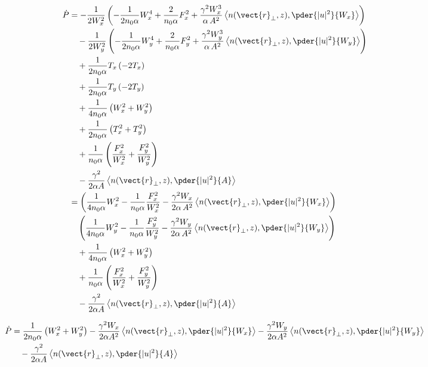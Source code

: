 \begin{equation}
\begin{split}
    \dot{P}  &= -\frac{1}{2W_{x}^2} \left(- \frac{1}{2 n_0 \alpha} W_{x}^4+ \frac{2}{n_0 \alpha} F_{x}^2  + \frac{\gamma^2 W_{x}^3}{ \alpha\, A^2}  \left<n(\vect{r}_{\perp},z), \pder{|u|^2}{W_{x}}\right>\right)  \\
    &\quad - \frac{1}{2W_{y}^2} \left(- \frac{1}{2 n_0 \alpha} W_{y}^4 + \frac{2}{n_0 \alpha} F_{y}^2  + \frac{\gamma^2 W_{y}^3}{ \alpha\, A^2}  \left<n(\vect{r}_{\perp},z), \pder{|u|^2}{W_{y}}\right>\right)\\
    &\quad + \frac{1}{2 n_0 \alpha}T_x  \left( - 2T_x \right) \\
    &\quad + \frac{1}{2 n_0 \alpha}T_y  \left( - 2T_y \right) \\
    &\quad + \frac{1}{4 n_0 \alpha}  \left(W_x^2+ W_y^2\right) \\    
    &\quad + \frac{1}{2 n_0 \alpha}  \left(T_x^2 + T_y^2 \right) \\
    &\quad + \frac{1}{n_0 \alpha}  \left(\frac{F_{x}^2}{W_{x}^2} + \frac{F_{y}^2}{W_{y}^2}\right) \\
    &\quad -  \frac{\gamma^2}{2 \alpha A} \left< n(\vect{r}_{\perp},z),\pder{|u|^2}{A}\right>   \\
    &=  \left(\frac{1}{4 n_0 \alpha} W_{x}^2 -\frac{1}{n_0 \alpha} \frac{F_{x}^2}{W_{x}^2} - \frac{\gamma^2 W_{x}}{ 2 \alpha\, A^2}  \left<n(\vect{r}_{\perp},z), \pder{|u|^2}{W_{x}}\right>\right)  \\
    &\quad\left( \frac{1}{4 n_0 \alpha} W_{y}^2 - \frac{1}{n_0 \alpha} \frac{F_{y}^2}{W_{y}^2} - \frac{\gamma^2 W_{y}}{ 2 \alpha\, A^2}  \left<n(\vect{r}_{\perp},z), \pder{|u|^2}{W_{y}}\right>\right)\\
    &\quad + \frac{1}{4 n_0 \alpha}  \left(W_x^2+ W_y^2\right) \\    
    &\quad + \frac{1}{n_0 \alpha}  \left(\frac{F_{x}^2}{W_{x}^2} + \frac{F_{y}^2}{W_{y}^2}\right) \\
    &\quad -  \frac{\gamma^2}{2 \alpha A} \left< n(\vect{r}_{\perp},z),\pder{|u|^2}{A}\right>   \\ 
\end{split}
\end{equation}


\begin{equation}
\begin{split}
    \dot{P}  &= \frac{1}{2 n_0 \alpha} \left(W_{x}^2 + W_{y}^2\right)  - \frac{\gamma^2 W_{x}}{ 2 \alpha A^2}  \left<n(\vect{r}_{\perp},z), \pder{|u|^2}{W_{x}}\right>  
    - \frac{\gamma^2 W_{y}}{ 2 \alpha A^2}  \left<n(\vect{r}_{\perp},z), \pder{|u|^2}{W_{y}}\right>\\
    &\quad -  \frac{\gamma^2}{2 \alpha A} \left< n(\vect{r}_{\perp},z),\pder{|u|^2}{A}\right> 
\end{split}
\end{equation}


